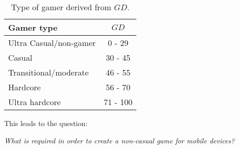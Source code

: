 \begin{table}[H]
\begin{tabular}{|l|c|}
\hline
\rowcolor[HTML]{C0C0C0} 
Gamer type             & $GD$     \\ \hline
Ultra Casual/non-gamer & 0 - 29   \\ \hline
Casual                 & 30 - 45  \\ \hline
Transitional/moderate  & 46 - 55  \\ \hline
Hardcore               & 56 - 70  \\ \hline
Ultra hardcore         & 71 - 100 \\ \hline
\end{tabular}
\caption{Type of gamer derived from $GD$.}
\label{tab:gamertype}
\end{table}

This leads to the question:
\begin{center}\label{intro:problem_statement}
\textit{What is required in order to create a non-casual game for mobile devices?}
\end{center}
